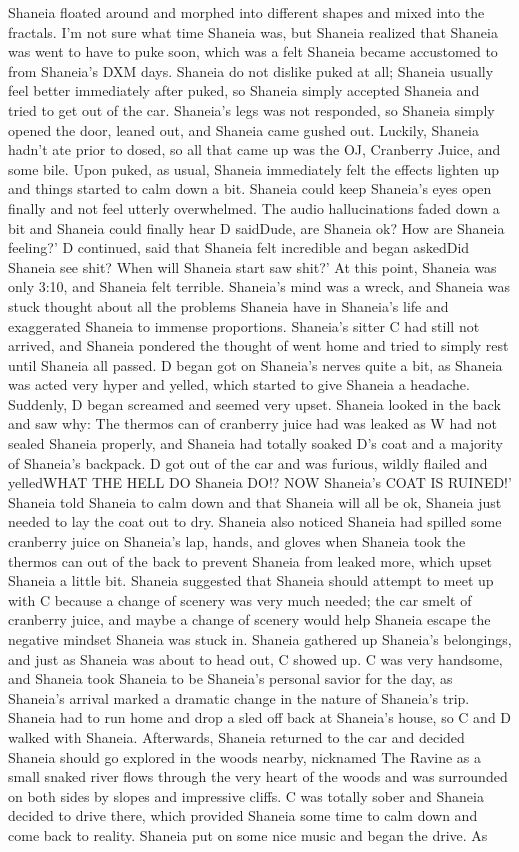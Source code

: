 \documentclass[12pt]{book}
\begin{document}
Shaneia floated around and morphed into different shapes and mixed into the fractals. I'm not sure what time Shaneia was, but Shaneia realized that Shaneia was went to have to puke soon, which was a felt Shaneia became accustomed to from Shaneia's DXM days. Shaneia do not dislike puked at all; Shaneia usually feel better immediately after puked, so Shaneia simply accepted Shaneia and tried to get out of the car. Shaneia's legs was not responded, so Shaneia simply opened the door, leaned out, and Shaneia came gushed out. Luckily, Shaneia hadn't ate prior to dosed, so all that came up was the OJ, Cranberry Juice, and some bile. Upon puked, as usual, Shaneia immediately felt the effects lighten up and things started to calm down a bit. Shaneia could keep Shaneia's eyes open finally and not feel utterly overwhelmed. The audio hallucinations faded down a bit and Shaneia could finally hear D saidDude, are Shaneia ok? How are Shaneia feeling?' D continued, said that Shaneia felt incredible and began askedDid Shaneia see shit? When will Shaneia start saw shit?' At this point, Shaneia was only 3:10, and Shaneia felt terrible. Shaneia's mind was a wreck, and Shaneia was stuck thought about all the problems Shaneia have in Shaneia's life and exaggerated Shaneia to immense proportions. Shaneia's sitter C had still not arrived, and Shaneia pondered the thought of went home and tried to simply rest until Shaneia all passed. D began got on Shaneia's nerves quite a bit, as Shaneia was acted very hyper and yelled, which started to give Shaneia a headache. Suddenly, D began screamed and seemed very upset. Shaneia looked in the back and saw why: The thermos can of cranberry juice had was leaked as W had not sealed Shaneia properly, and Shaneia had totally soaked D's coat and a majority of Shaneia's backpack. D got out of the car and was furious, wildly flailed and yelledWHAT THE HELL DO Shaneia DO!? NOW Shaneia's COAT IS RUINED!' Shaneia told Shaneia to calm down and that Shaneia will all be ok, Shaneia just needed to lay the coat out to dry. Shaneia also noticed Shaneia had spilled some cranberry juice on Shaneia's lap, hands, and gloves when Shaneia took the thermos can out of the back to prevent Shaneia from leaked more, which upset Shaneia a little bit. Shaneia suggested that Shaneia should attempt to meet up with C because a change of scenery was very much needed; the car smelt of cranberry juice, and maybe a change of scenery would help Shaneia escape the negative mindset Shaneia was stuck in. Shaneia gathered up Shaneia's belongings, and just as Shaneia was about to head out, C showed up. C was very handsome, and Shaneia took Shaneia to be Shaneia's personal savior for the day, as Shaneia's arrival marked a dramatic change in the nature of Shaneia's trip. Shaneia had to run home and drop a sled off back at Shaneia's house, so C and D walked with Shaneia. Afterwards, Shaneia returned to the car and decided Shaneia should go explored in the woods nearby, nicknamed The Ravine as a small snaked river flows through the very heart of the woods and was surrounded on both sides by slopes and impressive cliffs. C was totally sober and Shaneia decided to drive there, which provided Shaneia some time to calm down and come back to reality. Shaneia put on some nice music and began the drive. As 
\end{document}

